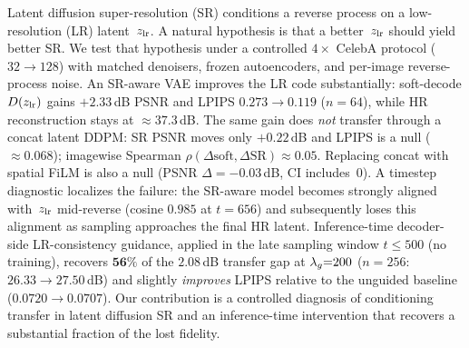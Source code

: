 Latent diffusion super-resolution (SR) conditions a reverse process on a
low-resolution (LR) latent~$z_{\mathrm{lr}}$.
A natural hypothesis is that a better~$z_{\mathrm{lr}}$ should yield better SR.
We test that hypothesis under a controlled $4\times$ CelebA protocol
($32\!\to\!128$) with matched denoisers, frozen autoencoders, and
per-image reverse-process noise.
An SR-aware VAE improves the LR code substantially:
soft-decode $D(z_{\mathrm{lr}})$ gains $\mathbf{+2.33}$\,dB PSNR and LPIPS
$0.273\!\to\!0.119$ ($n{=}64$), while HR reconstruction stays at
$\approx 37.3$\,dB.
The same gain does \emph{not} transfer through a concat latent DDPM:
SR PSNR moves only $\mathbf{+0.22}$\,dB and LPIPS is a null
($\approx 0.068$); imagewise Spearman $\rho(\Delta\mathrm{soft},\Delta\mathrm{SR})\approx 0.05$.
Replacing concat with spatial FiLM is also a null
(PSNR $\Delta=-0.03$\,dB, CI includes~$0$).
A timestep diagnostic localizes the failure: the SR-aware model
becomes strongly aligned with~$z_{\mathrm{lr}}$ mid-reverse (cosine $0.985$ at
$t{=}656$) and subsequently loses this alignment as sampling
approaches the final HR latent.
Inference-time decoder-side LR-consistency guidance, applied in the
late sampling window $t\le 500$ (no training), recovers
$\mathbf{56\%}$ of the $2.08$\,dB transfer gap at $\lambda_{g}{=}200$
($n{=}256$: $26.33\!\to\!27.50$\,dB) and slightly \emph{improves}
LPIPS relative to the unguided baseline ($0.0720\!\to\!0.0707$).
Our contribution is a controlled diagnosis of conditioning transfer in
latent diffusion SR and an inference-time intervention that recovers a
substantial fraction of the lost fidelity.
